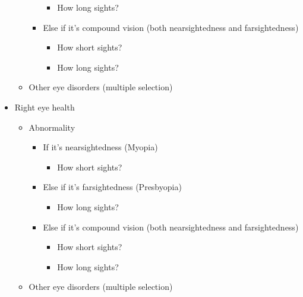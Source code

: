 \begin{multicols}{2}
\begin{itemize}
\begin{itemize}
\begin{itemize}
                \begin{itemize}
                    \item How long sights?
                \end{itemize}
                \item Else if it's compound vision (both nearsightedness and farsightedness)
                \begin{itemize}
                    \item How short sights?
                    \item How long sights?
                \end{itemize}
            \end{itemize}
            \item Other eye disorders (multiple selection)
        \end{itemize}
        \item Right eye health
        \begin{itemize}
            \item Abnormality
            \begin{itemize}
                \item If it's nearsightedness (Myopia)
                \begin{itemize}
                    \item How short sights?
                \end{itemize}
                \item Else if it's farsightedness (Presbyopia)
                \begin{itemize}
                    \item How long sights?
                \end{itemize}
                \item Else if it's compound vision (both nearsightedness and farsightedness)
                \begin{itemize}
                    \item How short sights?
                    \item How long sights?
                \end{itemize}
            \end{itemize}
            \item Other eye disorders (multiple selection)
        \end{itemize}
    \end{itemize}
\end{multicols}

